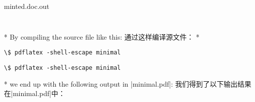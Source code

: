\begin{paracol}{2}
\begin{VerbatimOut}[gobble=1]{minted.doc.out}
\end{VerbatimOut}
\inputminted[frame=lines]{latex}{minted.doc.out}
\switchcolumn
\inputminted[frame=lines]{latex}{minted.doc.out}
\switchcolumn[0]*%
By compiling the source file like this:
\switchcolumn
通过这样编译源文件：
\switchcolumn[0]*%
\begin{Verbatim}[commandchars=\\\{\}]
\$ pdflatex -shell-escape minimal
\end{Verbatim}
\switchcolumn
\begin{Verbatim}[commandchars=\\\{\}]
\$ pdflatex -shell-escape minimal
\end{Verbatim}
\switchcolumn[0]*%
we end up with the following output in |minimal.pdf|:
\switchcolumn
我们得到了以下输出结果在|minimal.pdf|中：
\end{paracol}

\hfill
\colorbox{minted@samplebg}{\begin{minipage}{0.6\textwidth}
    \inputminted[firstline=7,lastline=10]{c}{minted.doc.out}
\end{minipage}}
\hfill\hfill



